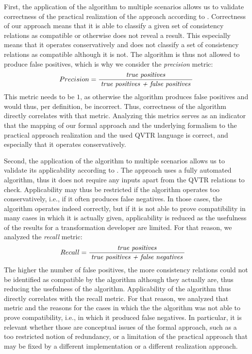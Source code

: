 First, the application of the algorithm to multiple scenarios allows us to validate correctness of the practical realization of the approach according to .
Correctness of our approach means that it is able to classify a given set of consistency relations as compatible or otherwise does not reveal a result.
This especially means that it operates conservatively and does not classify a set of consistency relations as compatible although it is not.
The algorithm is thus not allowed to produce false positives, which is why we consider the \emph{precision} metric:
\begin{align*}
    \hspace{1em} &
    Precision = \frac{\; \textit{true positives} \;}{\; \textit{true positives + false positives} \;}
\end{align*}
This metric needs to be $1$, as otherwise the algorithm produces false positives and would thus, per definition, be incorrect.
Thus, correctness of the algorithm directly correlates with that metric.
Analyzing this metrics serves as an indicator that the mapping of our formal approach and the underlying formalism to the practical approach realization and the used \gls{QVTR} language is correct, and especially that it operates conservatively.

Second, the application of the algorithm to multiple scenarios allows us to validate its applicability according to .
The approach uses a fully automated algorithm, thus it does not require any inputs apart from the \gls{QVTR} relations to check.
Applicability may thus be restricted if the algorithm operates too conservatively, i.e., if it often produces false negatives.
In those cases, the algorithm operates indeed correctly, but if it is not able to prove compatibility in many cases in which it is actually given, applicability is reduced as the usefulness of the results for a transformation developer are limited.
For that reason, we analyzed the \emph{recall} metric:
\begin{align*}
    &
    Recall = \frac{\; \textit{true positives} \;}{\; \textit{true positives + false negatives} \;}
\end{align*}
The higher the number of false positives, the more consistency relations could not be identified as compatible by the algorithm although they actually are, thus reducing the usefulness of the algorithm.
Applicability of the algorithm thus directly correlates with the recall metric.
For that reason, we analyzed that metric and the reasons for the cases in which the the algorithm was not able to 
prove compatibility, i.e., in which it produced false negatives.
In particular, it is relevant whether those are conceptual issues of the formal approach, such as a too restricted notion of redundancy, or a limitation of the practical approach that may be fixed by a different implementation or a different realization approach.

